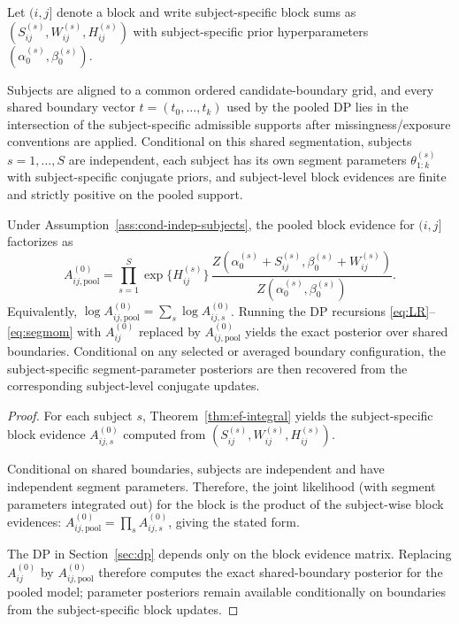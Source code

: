 Let $(i,j]$ denote a block and write subject-specific block sums as
$(S^{(s)}_{ij},W^{(s)}_{ij},H^{(s)}_{ij})$ with subject-specific prior hyperparameters
$(\alpha^{(s)}_0,\beta^{(s)}_0)$.

\begin{assumption}
\label{ass:cond-indep-subjects}
Subjects are aligned to a common ordered candidate-boundary grid, and every shared boundary vector
$t=(t_0,\dots,t_k)$ used by the pooled DP lies in the intersection of the subject-specific
admissible supports after missingness/exposure conventions are applied. Conditional on this shared
segmentation, subjects $s=1,\dots,S$ are independent, each subject has its own segment parameters
$\theta^{(s)}_{1:k}$ with subject-specific conjugate priors, and subject-level block evidences are
finite and strictly positive on the pooled support.
\end{assumption}

\begin{theorem}
\label{thm:multisubject}
Under Assumption~\ref{ass:cond-indep-subjects}, the pooled block evidence for $(i,j]$ factorizes as
\[
A^{(0)}_{ij,\mathrm{pool}}
 = \prod_{s=1}^S
    \exp\{H^{(s)}_{ij}\}\,
    \frac{Z(\alpha^{(s)}_0+S^{(s)}_{ij},\beta^{(s)}_0+W^{(s)}_{ij})}
         {Z(\alpha^{(s)}_0,\beta^{(s)}_0)}.
\]
Equivalently, $\log A^{(0)}_{ij,\mathrm{pool}}=\sum_s \log A^{(0)}_{ij,s}$. Running the DP
recursions \eqref{eq:LR}--\eqref{eq:segmom} with $A^{(0)}_{ij}$ replaced by
$A^{(0)}_{ij,\mathrm{pool}}$ yields the exact posterior over shared boundaries. Conditional on any
selected or averaged boundary configuration, the subject-specific segment-parameter posteriors are
then recovered from the corresponding subject-level conjugate updates.
\end{theorem}

\begin{proof}
For each subject $s$, Theorem~\ref{thm:ef-integral} yields the subject-specific block evidence
$A^{(0)}_{ij,s}$ computed from $(S^{(s)}_{ij},W^{(s)}_{ij},H^{(s)}_{ij})$.

Conditional on shared boundaries, subjects are independent and have independent segment
parameters. Therefore, the joint likelihood (with segment parameters integrated out) for the
block is the product of the subject-wise block evidences:
$A^{(0)}_{ij,\mathrm{pool}}=\prod_s A^{(0)}_{ij,s}$, giving the stated form.

The DP in Section~\ref{sec:dp} depends only on the block evidence matrix. Replacing
$A^{(0)}_{ij}$ by $A^{(0)}_{ij,\mathrm{pool}}$ therefore computes the exact shared-boundary
posterior for the pooled model; parameter posteriors remain available conditionally on boundaries
from the subject-specific block updates.
\end{proof}

